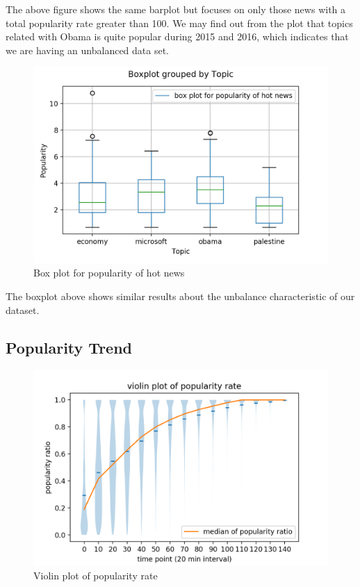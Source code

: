 \documentclass{article}
\begin{document}
The above figure shows the same barplot but focuses on only those news with a total popularity rate greater than 100. We may find out from the plot that topics related with Obama is quite popular during 2015 and 2016, which indicates that we are having an unbalanced data set.

\begin{figure}[H]
\centering
\includegraphics[scale=0.5]{"box plot for popularity of hot news"}
\caption{Box plot for popularity of hot news}
\end{figure}

The boxplot above shows similar results about the unbalance characteristic of our dataset.

 
\subsection{Popularity Trend}

\begin{figure}[H]
\centering
\includegraphics[scale=0.45]{"violin plot of popularity rate"}
\caption{Violin plot of popularity rate}
\end{figure}
\end{document}
